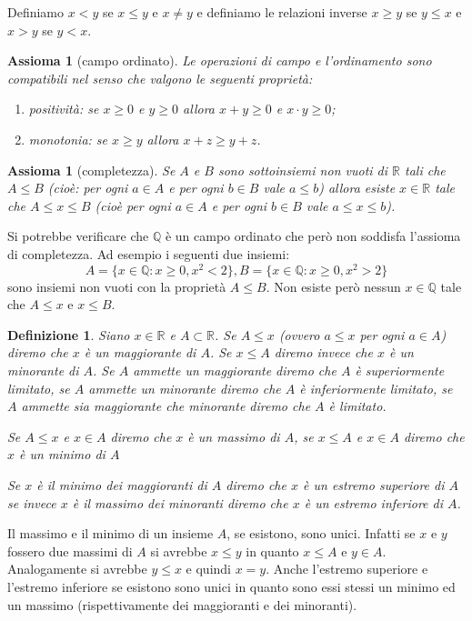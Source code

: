 \documentclass[italian,a4paper,oneside,headinclude]{scrbook}
\newcommand{\QQ}{\mathbb Q}
\newcommand{\RR}{\mathbb R}
\newtheorem{definition}[theorem]{Definizione}
\newtheorem{axiom}[theorem]{Assioma}
\begin{document}
Definiamo $x<y$ se $x\le y$ e $x \neq y$ e definiamo le relazioni
inverse $x \ge y$ se $y\le x$ e $x>y$ se $y<x$.

\begin{axiom}[campo ordinato]
Le operazioni di campo e l'ordinamento sono compatibili nel senso che
valgono le seguenti proprietà:
\begin{enumerate}
\item positività: se $x\ge 0$ e $y \ge 0$ allora $x+y \ge 0$ e $x\cdot y\ge 0$;
\item monotonia: se $x \ge y$ allora $x+z \ge y+z$.
\end{enumerate}
\end{axiom}

\begin{axiom}[completezza]\label{axiom_complete}
Se $A$ e $B$ sono sottoinsiemi non vuoti di $\RR$ tali che $A \le B$
(cioè: per ogni $a \in A$ e per ogni $b\in B$ vale $a\le b$) allora esiste
$x\in \RR$ tale che $A\le x \le B$ (cioè per ogni $a\in A$ e per ogni $b\in B$
vale $a\le x \le b$).
\end{axiom}

Si potrebbe verificare che $\QQ$ è un campo ordinato che però non soddisfa l'assioma
di completezza. Ad esempio i seguenti due insiemi:
\[
  A= \{x\in \QQ\colon x\ge 0, x^2 < 2\},
  B = \{x\in \QQ\colon x\ge 0, x^2 > 2\}
\]
sono insiemi non vuoti con la proprietà $A\le B$.
Non esiste però nessun $x\in \QQ$ tale che $A\le x$ e $x\le B$.


\begin{definition}
Siano $x \in \RR$ e $A \subset \RR$. Se $A\le x$ (ovvero $a\le x$ per ogni $a\in A$)
diremo che $x$ è un \emph{maggiorante} di $A$.
Se $x \le A$ diremo invece che $x$ è un \emph{minorante} di $A$.
Se $A$ ammette un maggiorante diremo che $A$ è \emph{superiormente limitato},
se $A$ ammette un minorante diremo che $A$ è \emph{inferiormente limitato},
se $A$ ammette sia maggiorante che minorante diremo che $A$ è \emph{limitato}.

Se $A \le x$ e $x\in A$ diremo che $x$ è un massimo di $A$,
se $x\le A$ e $x\in A$ diremo che $x$ è un minimo di $A$

Se $x$ è il minimo dei maggioranti di $A$ diremo che $x$ è
un \emph{estremo superiore}
di $A$ se invece $x$ è il massimo dei minoranti diremo che $x$ è
un \emph{estremo inferiore} di $A$.
\end{definition}

Il massimo e il minimo di un insieme $A$, se esistono, sono unici.
Infatti se $x$ e $y$ fossero due massimi di $A$ si avrebbe $x\le y$ in
quanto $x\le A$ e $y\in A$. Analogamente si avrebbe $y\le x$ e
quindi $x=y$.
Anche l'estremo superiore e l'estremo inferiore se esistono sono
unici in quanto sono essi stessi un minimo ed un massimo
(rispettivamente dei maggioranti e dei minoranti).
\end{document}
